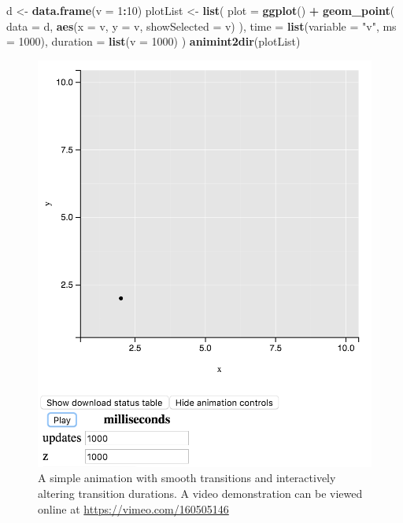 \documentclass[12pt,]{article}
\newenvironment{Shaded}{\begin{snugshade}}{\end{snugshade}}
\newcommand{\KeywordTok}[1]{\textcolor[rgb]{0.13,0.29,0.53}{\textbf{#1}}}
\newcommand{\DataTypeTok}[1]{\textcolor[rgb]{0.13,0.29,0.53}{#1}}
\newcommand{\DecValTok}[1]{\textcolor[rgb]{0.00,0.00,0.81}{#1}}
\newcommand{\StringTok}[1]{\textcolor[rgb]{0.31,0.60,0.02}{#1}}
\newcommand{\OperatorTok}[1]{\textcolor[rgb]{0.81,0.36,0.00}{\textbf{#1}}}
\newcommand{\NormalTok}[1]{#1}
\theoremstyle{definition}
\theoremstyle{definition}
\theoremstyle{remark}
\begin{document}
\begin{Shaded}
\begin{Highlighting}[]
\NormalTok{d <-}\StringTok{ }\KeywordTok{data.frame}\NormalTok{(}\DataTypeTok{v =} \DecValTok{1}\OperatorTok{:}\DecValTok{10}\NormalTok{)}
\NormalTok{plotList <-}\StringTok{ }\KeywordTok{list}\NormalTok{(}
  \DataTypeTok{plot =} \KeywordTok{ggplot}\NormalTok{() }\OperatorTok{+}\StringTok{ }\KeywordTok{geom_point}\NormalTok{(}
    \DataTypeTok{data =}\NormalTok{ d, }\KeywordTok{aes}\NormalTok{(}\DataTypeTok{x =}\NormalTok{ v, }\DataTypeTok{y =}\NormalTok{ v, }\DataTypeTok{showSelected =}\NormalTok{ v)}
\NormalTok{  ),}
  \DataTypeTok{time =} \KeywordTok{list}\NormalTok{(}\DataTypeTok{variable =} \StringTok{"v"}\NormalTok{, }\DataTypeTok{ms =} \DecValTok{1000}\NormalTok{),}
  \DataTypeTok{duration =} \KeywordTok{list}\NormalTok{(}\DataTypeTok{v =} \DecValTok{1000}\NormalTok{)}
\NormalTok{)}
\KeywordTok{animint2dir}\NormalTok{(plotList)}
\end{Highlighting}
\end{Shaded}

\begin{figure}
\centering
\includegraphics{images/animation}
\caption{\label{fig:animation}A simple animation with smooth transitions and
interactively altering transition durations. A video demonstration can
be viewed online at \url{https://vimeo.com/160505146}}
\end{figure}
\end{document}
